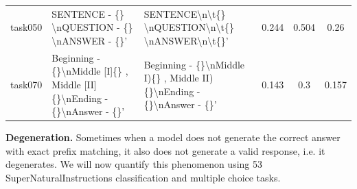 \documentclass{article} %
\renewcommand{\paragraph}[1]{\textbf{#1}}
\begin{document}
\begin{table}[h]
\begin{tabular}{@{}cp{4.2cm\ttfamily\tiny}p{4.2cm\ttfamily\tiny}ccc@{}}
task050    & SENTENCE - \{\} \textbackslash{}nQUESTION - \{\} \textbackslash{}nANSWER - \{\}'                                                                                                                                                                                                                                                                                                                                     & SENTENCE\textbackslash{}n\textbackslash{}t\{\} \textbackslash{}nQUESTION\textbackslash{}n\textbackslash{}t\{\} \textbackslash{}nANSWER\textbackslash{}n\textbackslash{}t\{\}'                                                                                                                                                                                                                                       & 0.244  & 0.504  & 0.26      \\
task070    & Beginning - \{\}\textbackslash{}nMiddle {[}I{]}\{\} , Middle {[}II{]}\{\}\textbackslash{}nEnding - \{\}\textbackslash{}nAnswer - \{\}'                                                                                                                                                                                                                                                                               & Beginning - \{\}\textbackslash{}nMiddle I)\{\} , Middle II)\{\}\textbackslash{}nEnding - \{\}\textbackslash{}nAnswer - \{\}'                                                                                                                                                                                                                                                                                        & 0.143  & 0.3    & 0.157    \\ \bottomrule
\end{tabular}
\end{table}


\paragraph{Degeneration.}\label{sec:degeneration}
Sometimes when a model does not generate the correct answer with exact prefix matching, it also does not generate a valid response, i.e. it degenerates. We will now quantify this phenomenon using 53 SuperNaturalInstructions classification and multiple choice tasks.
\end{document}
